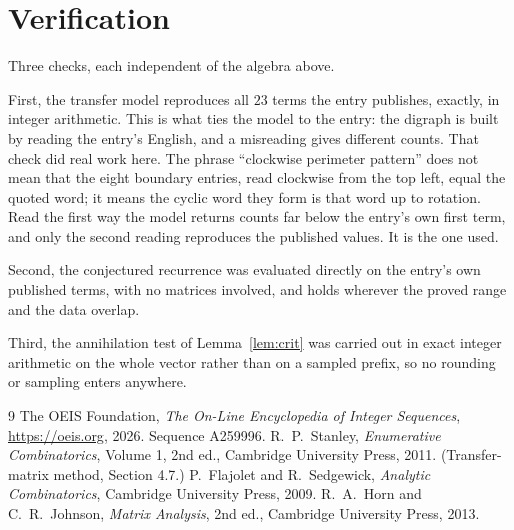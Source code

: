 \documentclass[11pt,a4paper]{article}
\theoremstyle{plain}
\theoremstyle{definition}
\begin{document}
\section{Verification}

Three checks, each independent of the algebra above.

First, the transfer model reproduces all $23$ terms the entry publishes, exactly, in
integer arithmetic. This is what ties the model to the entry: the digraph is built by reading
the entry's English, and a misreading gives different counts. That check did real work here. The phrase ``clockwise perimeter pattern'' does not mean that the eight boundary entries, read clockwise from the top left, equal the quoted word; it means the cyclic word they form is that word up to rotation. Read the first way the model returns counts far below the entry's own first term, and only the second reading reproduces the published values. It is the one used.

Second, the conjectured recurrence was evaluated directly on the entry's own published terms,
with no matrices involved, and holds wherever the proved range and the data overlap.

Third, the annihilation test of Lemma~\ref{lem:crit} was carried out in exact integer
arithmetic on the whole vector rather than on a sampled prefix, so no rounding or sampling
enters anywhere.

\begin{thebibliography}{9}
 The OEIS Foundation, \emph{The On-Line Encyclopedia of Integer
Sequences}, \url{https://oeis.org}, 2026. Sequence A259996.
 R.~P.~Stanley, \emph{Enumerative Combinatorics}, Volume 1, 2nd ed.,
Cambridge University Press, 2011. (Transfer-matrix method, Section 4.7.)
 P.~Flajolet and R.~Sedgewick, \emph{Analytic Combinatorics}, Cambridge
University Press, 2009.
 R.~A.~Horn and C.~R.~Johnson, \emph{Matrix Analysis}, 2nd ed., Cambridge
University Press, 2013.
\end{thebibliography}
\end{document}
